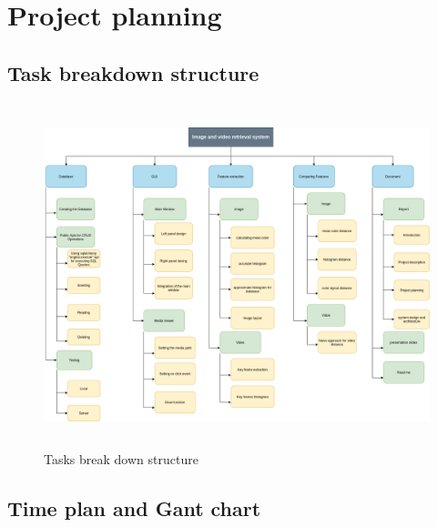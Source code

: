 \chapter{Project planning}


\section{Task breakdown structure}

\begin{figure}[H]
    \centering
    \includegraphics[width=120mm,height=100mm]{Images/TBDS.png}
    \caption{Tasks break down structure}
  \end{figure}




\section{Time plan and Gant chart}
